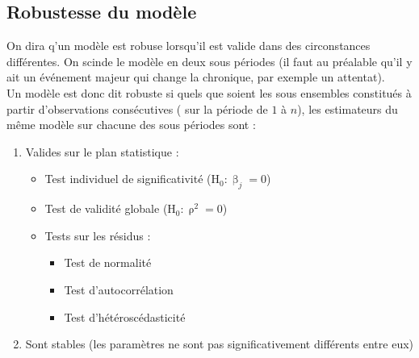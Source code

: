 \documentclass{article}
\begin{document}
\subsection{Robustesse du modèle}
On dira q'un modèle est robuse lorsqu'il est valide dans des circonstances différentes. On scinde le modèle en deux sous périodes (il faut au préalable qu'il y ait un 
événement majeur qui change la chronique, par exemple un attentat). \\
Un modèle est donc dit robuste si quels que soient les sous ensembles constitués à partir d'observations consécutives ( sur la période de $1$ à $n$), les estimateurs du même modèle
sur chacune des sous périodes sont : 
\begin{enumerate}
		\item Valides sur le plan statistique :
		\begin{itemize}
			\item Test individuel de significativité (H$_0 : \upbeta_j = 0$)
			\item Test de validité globale (H$_0 : \uprho^2 = 0$)
			\item Tests sur les résidus :
			\begin{itemize}
				\item Test de normalité
				\item Test d'autocorrélation
				\item Test d'hétéroscédasticité
			\end{itemize}
		\end{itemize}
		\item Sont stables (les paramètres ne sont pas significativement différents entre eux)
\end{enumerate}
\end{document}
